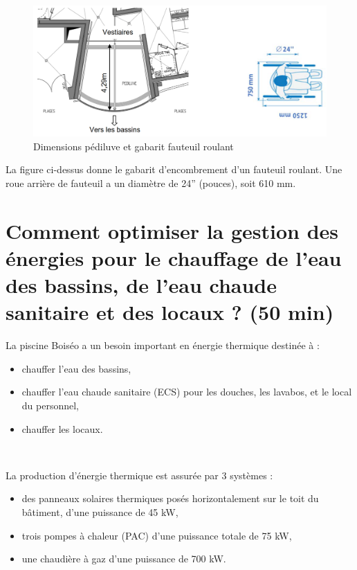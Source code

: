 \begin{figure}[ht!]
\begin{center}
 \includegraphics[width=0.6\linewidth]{img/fig002}
\end{center}
\label{fig002}
\caption{Dimensions pédiluve et gabarit fauteuil roulant}
\end{figure}

La figure ci-dessus donne le gabarit d'encombrement d'un fauteuil roulant. Une roue arrière de fauteuil a un diamètre de 24'' (pouces), soit 610 mm.


\section{Comment optimiser la gestion des énergies pour le chauffage de l'eau des bassins, de l'eau chaude sanitaire et des locaux ? (50 min)}

La piscine Boiséo a un besoin important en énergie thermique destinée à :
\begin{itemize}
 \item chauffer l'eau des bassins,
 \item chauffer l'eau chaude sanitaire (ECS) pour les douches, les lavabos, et le local du personnel,
 \item chauffer les locaux.
\end{itemize}



~\

La production d'énergie thermique est assurée par 3 systèmes :
\begin{itemize}
 \item des panneaux solaires thermiques posés horizontalement sur le toit du bâtiment, d'une puissance de 45 kW,
 \item trois pompes à chaleur (PAC) d'une puissance totale de 75 kW,
 \item une chaudière à gaz d'une puissance de 700 kW.
\end{itemize}

